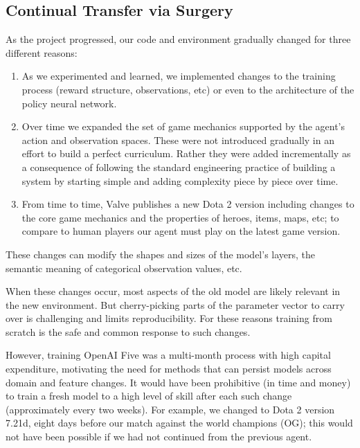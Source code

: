 \documentclass[11pt]{article}
\newcommand{\dota}{Dota 2\xspace}
\newcommand{\openaifive}{OpenAI Five\xspace}
\begin{document}
\subsection{Continual Transfer via Surgery}\label{sec:surgery}
As the project progressed, our code and environment gradually changed for three different reasons:
\begin{enumerate}
    \item\label{item:surgey-change:architecture} As we experimented and learned, we implemented changes to the training process (reward structure, observations, etc) or even to the architecture of the policy neural network.     
    \item\label{item:surgey-change:new-stuff} Over time we expanded the set of game mechanics supported by the agent's action and observation spaces. These were not introduced gradually in an effort to build a perfect curriculum. Rather they were added incrementally as a consequence of following the standard engineering practice of building a system by starting simple and adding complexity piece by piece over time.    
    \item\label{item:surgey-change:version} From time to time, Valve publishes a new \dota version including changes to the core game mechanics and the properties of heroes, items, maps, etc; to compare to human players our agent must play on the latest game version.
\end{enumerate}
These changes can modify the shapes and sizes of the model's layers, the semantic meaning of categorical observation values, etc.

When these changes occur, most aspects of the old model are likely relevant in the new environment. 
But cherry-picking parts of the parameter vector to carry over is challenging and limits reproducibility. For these reasons training from scratch is the safe and common response to such changes.

However, training \openaifive was a multi-month process with high capital expenditure, motivating the need for methods that can persist models across domain and feature changes. 
It would have been prohibitive (in time and money) to train a fresh model to a high level of skill after each such change (approximately every two weeks).
For example, we changed to \dota version 7.21d, eight days before our match against the world champions (OG); this would not have been possible if we had not continued from the previous agent. 
\end{document}
